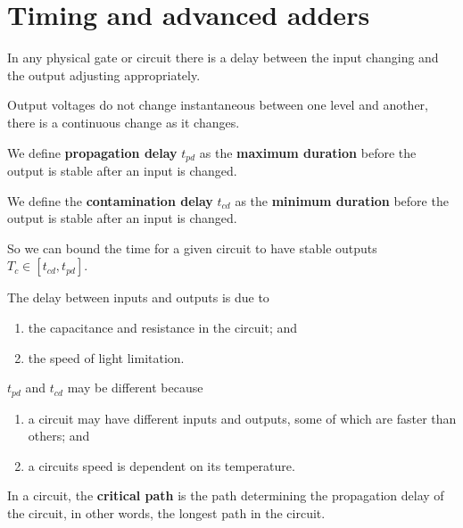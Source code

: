 
\section{Timing and advanced adders}

In any physical gate or circuit there is a delay between the input changing and the output adjusting appropriately. 

\begin{remark}
    Output voltages do not change instantaneous between one level and another, there is a continuous change as it changes.
\end{remark}

\begin{definition}
    We define \textbf{propagation delay} $t_{pd}$ as the \textbf{maximum duration} before the output is stable after an input is changed.
\end{definition}

\begin{definition}
    We define the \textbf{contamination delay} $t_{cd}$ as the \textbf{minimum duration} before the output is stable after an input is changed.
\end{definition}

So we can bound the time for a given circuit to have stable outputs $T_c\in[t_{cd},t_{pd}]$. 

The delay between inputs and outputs is due to
\begin{enumerate}
    \item the capacitance and resistance in the circuit; and
    \item the speed of light limitation.
\end{enumerate}

$t_{pd}$ and $t_{cd}$ may be different because
\begin{enumerate}
    \item a circuit may have different inputs and outputs, some of which are faster than others; and
    \item a circuits speed is dependent on its temperature.
\end{enumerate}

\begin{definition}
    In a circuit, the \textbf{critical path} is the path determining the propagation delay of the circuit, in other words, the longest path in the circuit.
\end{definition}

